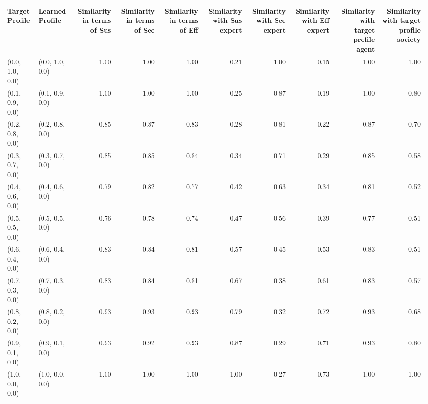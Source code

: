 \begin{tabular}{llrrrrrrrr}
\toprule
Target Profile & Learned Profile & Similarity in terms of Sus & Similarity in terms of Sec & Similarity in terms of Eff & Similarity with Sus expert & Similarity with Sec expert & Similarity with Eff expert & Similarity with target profile agent & Similarity with target profile society \\
\midrule
(0.0, 1.0, 0.0) & (0.0, 1.0, 0.0) & 1.00 & 1.00 & 1.00 & 0.21 & 1.00 & 0.15 & 1.00 & 1.00 \\
(0.1, 0.9, 0.0) & (0.1, 0.9, 0.0) & 1.00 & 1.00 & 1.00 & 0.25 & 0.87 & 0.19 & 1.00 & 0.80 \\
(0.2, 0.8, 0.0) & (0.2, 0.8, 0.0) & 0.85 & 0.87 & 0.83 & 0.28 & 0.81 & 0.22 & 0.87 & 0.70 \\
(0.3, 0.7, 0.0) & (0.3, 0.7, 0.0) & 0.85 & 0.85 & 0.84 & 0.34 & 0.71 & 0.29 & 0.85 & 0.58 \\
(0.4, 0.6, 0.0) & (0.4, 0.6, 0.0) & 0.79 & 0.82 & 0.77 & 0.42 & 0.63 & 0.34 & 0.81 & 0.52 \\
(0.5, 0.5, 0.0) & (0.5, 0.5, 0.0) & 0.76 & 0.78 & 0.74 & 0.47 & 0.56 & 0.39 & 0.77 & 0.51 \\
(0.6, 0.4, 0.0) & (0.6, 0.4, 0.0) & 0.83 & 0.84 & 0.81 & 0.57 & 0.45 & 0.53 & 0.83 & 0.51 \\
(0.7, 0.3, 0.0) & (0.7, 0.3, 0.0) & 0.83 & 0.84 & 0.81 & 0.67 & 0.38 & 0.61 & 0.83 & 0.57 \\
(0.8, 0.2, 0.0) & (0.8, 0.2, 0.0) & 0.93 & 0.93 & 0.93 & 0.79 & 0.32 & 0.72 & 0.93 & 0.68 \\
(0.9, 0.1, 0.0) & (0.9, 0.1, 0.0) & 0.93 & 0.92 & 0.93 & 0.87 & 0.29 & 0.71 & 0.93 & 0.80 \\
(1.0, 0.0, 0.0) & (1.0, 0.0, 0.0) & 1.00 & 1.00 & 1.00 & 1.00 & 0.27 & 0.73 & 1.00 & 1.00 \\
\bottomrule
\end{tabular}
